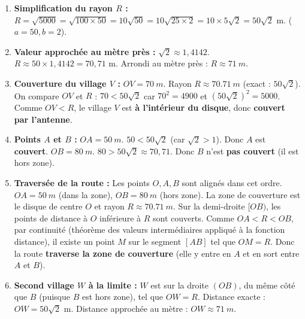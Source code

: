 \documentclass[11pt]{article}
\begin{document}
\begin{corrige}
\begin{enumerate}
    \item \textbf{Simplification du rayon $R$ :}
    $R = \sqrt{5000} = \sqrt{100 \times 50} = 10\sqrt{50} = 10\sqrt{25 \times 2} = 10 \times 5 \sqrt{2} = \boxed{50\sqrt{2} \text{ m}}$.
    ($a=50, b=2$).
    
    \item \textbf{Valeur approchée au mètre près :}
    $\sqrt{2} \approx 1,4142$.
    $R \approx 50 \times 1,4142 = 70,71$ m.
    Arrondi au mètre près : $\boxed{R \approx \SI{71}{m}}$.
    
    \item \textbf{Couverture du village $V$ :}
    $OV = \SI{70}{m}$. Rayon $R \approx \SI{70,71}{m}$ (exact : $50\sqrt{2}$).
    On compare $OV$ et $R$ : $70 < 50\sqrt{2}$ car $70^2 = 4900$ et $(50\sqrt{2})^2 = 5000$.
    Comme $OV < R$, le village $V$ est \textbf{à l'intérieur du disque}, donc \textbf{couvert par l'antenne}.
    
    \item \textbf{Points $A$ et $B$ :}
    $OA = \SI{50}{m}$. $50 < 50\sqrt{2}$ (car $\sqrt{2}>1$). Donc $A$ est \textbf{couvert}.
    $OB = \SI{80}{m}$. $80 > 50\sqrt{2} \approx 70,71$. Donc $B$ n'est \textbf{pas couvert} (il est hors zone).
    
    \item \textbf{Traversée de la route :}
    Les points $O, A, B$ sont alignés dans cet ordre. $OA = \SI{50}{m}$ (dans la zone), $OB = \SI{80}{m}$ (hors zone).
    La zone de couverture est le disque de centre $O$ et rayon $R \approx \SI{70,71}{m}$.
    Sur la demi-droite $[OB)$, les points de distance à $O$ inférieure à $R$ sont couverts.
    Comme $OA < R < OB$, par continuité (théorème des valeurs intermédiaires appliqué à la fonction distance), il existe un point $M$ sur le segment $[AB]$ tel que $OM = R$.
    Donc la route \textbf{traverse la zone de couverture} (elle y entre en $A$ et en sort entre $A$ et $B$).
    
    \item \textbf{Second village $W$ à la limite :}
    $W$ est sur la droite $(OB)$, du même côté que $B$ (puisque $B$ est hors zone), tel que $OW = R$.
    Distance exacte : $\boxed{OW = 50\sqrt{2} \text{ m}}$.
    Distance approchée au mètre : $\boxed{OW \approx \SI{71}{m}}$.
\end{enumerate}
\end{corrige}
\end{document}
